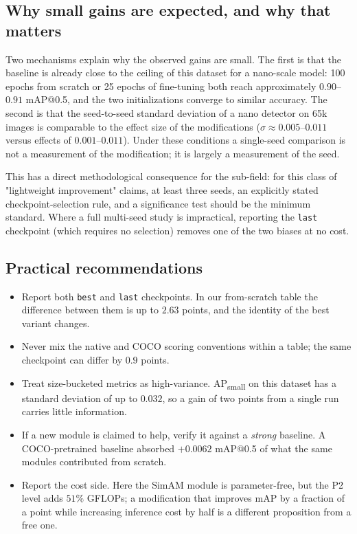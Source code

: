 \documentclass[pdflatex,sn-basic,Numbered]{sn-jnl}%
\begin{document}
\subsection{Why small gains are expected, and why that matters}

Two mechanisms explain why the observed gains are small. The first is that the baseline is already close to the ceiling of this dataset for a nano-scale model: 100 epochs from scratch or 25 epochs of fine-tuning both reach approximately $0.90$--$0.91$ mAP@0.5, and the two initializations converge to similar accuracy. The second is that the seed-to-seed standard deviation of a nano detector on 65k images is comparable to the effect size of the modifications ($\sigma \approx 0.005$--$0.011$ versus effects of $0.001$--$0.011$). Under these conditions a single-seed comparison is not a measurement of the modification; it is largely a measurement of the seed.

This has a direct methodological consequence for the sub-field: for this class of "lightweight improvement" claims, at least three seeds, an explicitly stated checkpoint-selection rule, and a significance test should be the minimum standard. Where a full multi-seed study is impractical, reporting the \texttt{last} checkpoint (which requires no selection) removes one of the two biases at no cost.

\subsection{Practical recommendations}

\begin{itemize}
\item Report both \texttt{best} and \texttt{last} checkpoints. In our from-scratch table the difference between them is up to $2.63$ points, and the identity of the best variant changes.
\item Never mix the native and COCO scoring conventions within a table; the same checkpoint can differ by $0.9$ points.
\item Treat size-bucketed metrics as high-variance. AP\textsubscript{small} on this dataset has a standard deviation of up to $0.032$, so a gain of two points from a single run carries little information.
\item If a new module is claimed to help, verify it against a \emph{strong} baseline. A COCO-pretrained baseline absorbed $+0.0062$ mAP@0.5 of what the same modules contributed from scratch.
\item Report the cost side. Here the SimAM module is parameter-free, but the P2 level adds $51\%$ GFLOPs; a modification that improves mAP by a fraction of a point while increasing inference cost by half is a different proposition from a free one.
\end{itemize}
\end{document}
